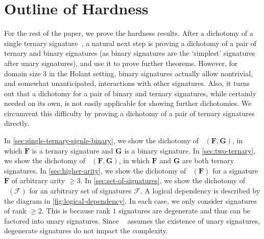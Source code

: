 \documentclass[11pt]{article}
\DeclareMathOperator{\hols}{Holant^*}
\DeclareMathOperator{\holts}{Holant^*_3}
\begin{document}
 
\section{Outline of Hardness}
For the rest of the paper, we prove the hardness results.
After a dichotomy of a single ternary signature~\cite{cai_dichotomy_2013}, a natural next step is proving a dichotomy of a pair of ternary and binary signatures (as binary signatures are the `simplest' signatures after unary signatures), and use it to prove further theorems.
However, for domain size 3 in the Holant setting, 
binary signatures actually allow nontrivial, and somewhat unanticipated, interactions with other signatures. 
Also, it turns out that a dichotomy for a pair of binary and ternary signatures,
while certainly needed on its own, is not easily applicable for showing further dichotomies. 
 We circumvent this difficulty by proving a dichotomy of a pair of ternary signatures directly.

In \cref{sec:single-ternary-signle-binary}, we show the dichotomy of $\holts(\mathbf{F}, \mathbf{G})$, in which $\mathbf{F}$ is a ternary signature and $\mathbf{G}$ is a binary signature.
In \cref{sec:two-ternary}, we show the dichotomy of $\holts(\mathbf{F}, \mathbf{G})$, in which $\mathbf{F}$ and $\mathbf{G}$ are both ternary signatures.
In \cref{sec:higher-arity}, we show the dichotomy of $\holts(\mathbf{F})$ for a signature $\mathbf{F}$ of arbitrary arity $\ge 3$.
In \cref{sec:set-of-signatures}, we show the dichotomy of $\holts(\mathcal{F})$ for an arbitrary set of signatures $\mathcal{F}$. 
A logical dependency is described by the diagram in 
\cref{fig:logical-dependency}.
In each case, we only consider signatures of rank $\ge 2$.
This is because rank $1$ signatures are degenerate and thus can be factored into unary signatures. 
Since $\hols$ assumes the existence of unary signatures, degenerate signatures do not impact the complexity.
\end{document}
